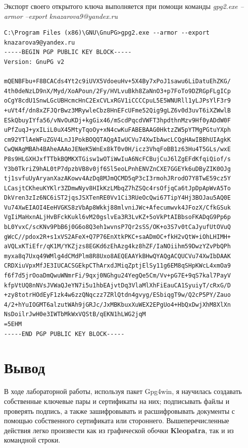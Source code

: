 \documentclass[10pt,a4paper]{report}
\begin{document}
Экспорт своего открытого ключа выполняется при помощи команды \textit{gpg2.exe --armor --export knazarova9@yandex.ru}
\begin{verbatim}
C:\Program Files (x86)\GNU\GnuPG>gpg2.exe --armor --export knazarova9@yandex.ru
-----BEGIN PGP PUBLIC KEY BLOCK-----
Version: GnuPG v2

mQENBFbu+F8BCACds4Yt2c9iUVX5VdoeuHv+5X4By7xPoJ1sawu6LiDatuEhZKG/
4th0deNzLD9nX/Myd/XoAPoun/2Fy/HVLvuBkh8ZaNnO3+p7FoTo9DZRGpFLgICp
oCgY8cdU1SnwLGcUBHcmcHnC2ExCVLxRGV1iCCCCpuL5E5WNURll1yLJPsYlF3r9
+uVt4f/dn8xZFJQrBwz3MRywleCbz8HnEFcUFme52Qig9gLZ6v0d3uvT6iXZWwlB
ESkQbuyIYfa56/vNvOuKDj+kgGix46/mScdPqcdVWFT3hpdthnMzv9Hf0yADdW0F
uPfZuqJ+yxILiL0uX45MtyTqoOy+xN4cwKuFABEBAAG0HktzZW5pYTMgPGtuYXph
cm92YTlAeWFuZGV4LnJ1PokBOQQTAQgAIwUCVu74XwIbAwcLCQgHAwIBBhUIAgkK
CwQWAgMBAh4BAheAAAoJENeK5WnEx8kT0v0H/icz3VhqFoBB1z63Hu4T5GLs/wxE
P8s9HLGXHJxfTTbkBQMKXTGisw1wOTiWwIuA6NcFCBujCuJ6lZgEFdKfqiQiof/s
Y3b0TkriZ9hAL0tP7dpzbVB8v0jf6Sl5eoLPnhENVZnCXE7GGEYk6uDByZIK0OJg
tj1svfuUyAryanXazAKowv4AzDq8MJmQCMD5qP3cI3rmohJRrodO7Y8TwE59cz5Y
LCasjtCKheuKYKlr3ZDmwNyv8HIkKzLMbqZ7hZSQc4rsOfjqCa6tJpDpApWvA5To
DkVren3zIz6NC6iST2jqsJSXTenRE0Vv1Ci3RUeOcQwi67TipY4Hj3BOJau5AQ0E
Vu74XwEIAOI4EeHVGKS8zVbAp8Wkkj88mlvniJWc+Afecumwvk4JFozX/CfkGSuk
VgIiMaHxnALjHvBFckKukl6vM20gslvEa3R3LvKZ+5oVkPtAIBbsoFKADqG9Pp6p
bL0YvxC/scKNv9PbB6j0G6o8Q3eh1wvnsP7Qr2sSS/OK+o3S7v0tCaJyufUtOVuQ
gWcC//pdox2R+s1xVS2AFeX+Q7P76EnXtkPKC+saADmOC+fkH2vQtW+iOhLHIMH+
aVQLxKTiEfr/qK1M/YKZjzs8EGKd6zEhAzg4kz8hZF/IaNOiihm59DwzYZvPbQPh
myxa8q7Uxq49WMlg4dCMdPlm8R8Uxo8AEQEAAYkBHwQYAQgACQUCVu74XwIbDAAK
CRDXiuVpxMfJE3IUCACSGEkpCThArxdJMiqZptjElSy11g6EM8qSHpKWcL4xmOa9
f6f7d5jrOoaDmQwuWNmrFi/9qxj0NGhgu24YegQe5Cm/Vv+pG7E+9qS7kal7PayV
kfpVtUQ8nNVsJVWaQJeYN7i5u1hbEAjvtDq3VlaMlXhFiEauCA1SyuiyT/cRxG/D
+zy8totrHOdEyF1zk4w6zzQNqczz7ZRlQtdn4gvyg/ESbiqgT9w/Q2cP5PY/Zauo
4/2+hYuIOGMT6alzutWAh9jGRJc/JxMBKbuxXuWEX2EPgUo4+HbQxDwjXhM8XlXn
NsDoilrJwH0e3IWTbMkWxVQStB/qEKN1hLWG2jqM
=5EHM
-----END PGP PUBLIC KEY BLOCK-----
\end{verbatim}
\section{Вывод}
В ходе лабораторной работы, используя пакет Gpg4win, я научилась создавать собственные ключевые пары и сертификаты на них; подписывать файлы и проверять подпись, а также зашифровывать и расшифровывать документы с помощью собственного сертификата или стороннего. Вышеперечисленные действия легко произвести как из графической обочки \textbf{Kleopatra}, так и из командной строки. 
\end{document}
